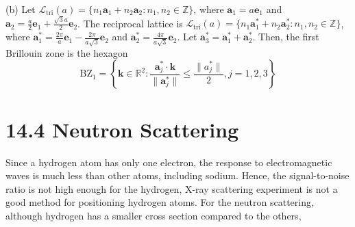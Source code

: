 \documentclass[a4paper,11pt]{article}
\begin{document}
(b) Let $\mathcal L_{\text{tri}}(a)=\{n_1\mathbf a_1+n_2\mathbf a_2:n_1, n_2\in\mathbb Z\}$, where $\mathbf a_1=a\mathbf e_1$ and $\mathbf a_2=\frac{a}{2}\mathbf e_1+\frac{\sqrt{3}a}{2}\mathbf e_2$. The reciprocal lattice is $\mathcal L_{\text{tri}}(a)=\{n_1\mathbf a_1^*+n_2\mathbf a_2^*:n_1, n_2\in\mathbb Z\}$, where $\mathbf a_1^*=\frac{2\pi}{a}\mathbf e_1-\frac{2\pi}{a\sqrt{3}}\mathbf e_2$ and $\mathbf a^*_2=\frac{4\pi}{a\sqrt{3}}\mathbf e_2$. Let $\mathbf a_3^*=\mathbf a_1^*+\mathbf a_2^*$. Then, the first Brillouin zone is the hexagon
\begin{equation}
    \mathrm{BZ}_1=\left\{\mathbf k\in\mathbb R^2:\frac{\mathbf a_{j}^*\cdot \mathbf k}{\|\mathbf a_j^*\|}\le\frac{\|a_j^*\|}{2}, j=1,2,3\right\}
\end{equation}







\section{14.4 Neutron Scattering}

Since a hydrogen atom has only one electron, the response to electromagnetic waves is much less than other atoms, including sodium. Hence, the signal-to-noise ratio is not high enough for the hydrogen, X-ray scattering experiment is not a good method for positioning hydrogen atoms. For the neutron scattering, although hydrogen has a smaller cross section compared to the others,  
\end{document}
